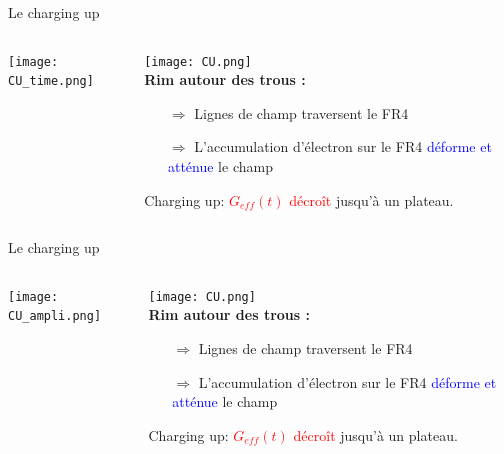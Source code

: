     \begin{frame}{Le charging up}
        \begin{scriptsize}
            \begin{columns}
       			\begin{column}{0.5\textwidth}
           			\texttt{[image: CU\_time.png]}
       			\end{column}\hfill
       			\begin{column}{0.5\textwidth}
       				\texttt{[image: CU.png]}\\\vspace{1cm}
           			\textbf{Rim autour des trous :}
       				\begin{itemize}
       					\item[$\Rightarrow$] Lignes de champ traversent le FR4\\
       					\item[$\Rightarrow$] L'accumulation d'électron sur le FR4 \textcolor{blue}{déforme et atténue} le champ
       				\end{itemize}
       				Charging up: \textcolor{red}{$G_{eff}(t)$ décroît} jusqu'à un plateau.
           		\end{column}
           	\end{columns}
        \end{scriptsize}
    \end{frame}
        
        \begin{frame}{Le charging up}
            \begin{scriptsize}
                \begin{columns}
           			\begin{column}{0.5\textwidth}
               			\texttt{[image: CU\_ampli.png]}
           			\end{column}\hfill
           			\begin{column}{0.5\textwidth}
           				\texttt{[image: CU.png]}\\\vspace{1cm}
               			\textbf{Rim autour des trous :}
           				\begin{itemize}
           					\item[$\Rightarrow$] Lignes de champ traversent le FR4\\
           					\item[$\Rightarrow$] L'accumulation d'électron sur le FR4 \textcolor{blue}{déforme et atténue} le champ
           				\end{itemize}
           				Charging up: \textcolor{red}{$G_{eff}(t)$ décroît} jusqu'à un plateau.
               		\end{column}
               	\end{columns}
            \end{scriptsize}
        \end{frame}

